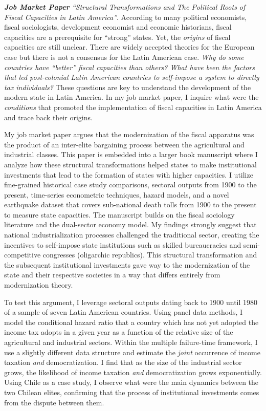\documentclass[11pt]{letter} %
\begin{document}
\begin{letter}{}
\emph{{\bf Job Market Paper} ``Structural Transformations and The Political Roots of Fiscal Capacities in Latin America''}. According  to many political economists, fiscal sociologists, development economist and economic historians, fiscal capacities are a prerequisite for ``strong'' states. Yet, the \emph{origins} of fiscal capacities are still unclear. There are widely accepted theories for the European case but there is not a consensus for the Latin American case. \emph{Why do some countries have ``better'' fiscal capacities than others? What have been the factors that led post-colonial Latin American countries to self-impose a system to directly tax individuals?} These questions are key to understand the development of the modern state in Latin America. In my job market paper, I inquire what were the \emph{conditions} that promoted the implementation of fiscal capacities in Latin America and trace back their origins.


My job market paper argues that the modernization of the fiscal apparatus was the product of an inter-elite bargaining process between the agricultural and industrial classes. This paper is embedded into a larger book manuscript where I analyze how these structural transformations helped states to make institutional investments that lead to the formation of states with higher capacities. I utilize fine-grained historical case study comparisons, sectoral outputs from 1900 to the present, time-series econometric techniques, hazard models, and a novel earthquake dataset that covers sub-national death tolls from 1900 to the present to measure state capacities. The manuscript builds on the fiscal sociology literature and the dual-sector economy model. My findings strongly suggest that national industrialization processes challenged the traditional sector, creating the incentives to self-impose state institutions such as skilled bureaucracies and semi-competitive congresses (oligarchic republics). This structural transformation and the subsequent institutional investments gave way to the modernization of the state and their respective societies in a way that differs entirely from modernization theory.


To test this argument, I leverage sectoral outputs dating back to 1900 until 1980 of a sample of seven Latin American countries. Using panel data methods, I model the conditional hazard ratio that a country which has not yet adopted the income tax adopts in a given year as a function of the relative size of the agricultural and industrial sectors. Within the multiple failure-time framework, I use a slightly different data structure and estimate the \emph{joint} occurrence of income taxation \emph{and} democratization. I find that as the size of the industrial sector grows, the likelihood of income taxation \emph{and} democratization grows exponentially. Using Chile as a case study, I observe what were the main dynamics between the two Chilean elites, confirming that the process of institutional investments comes from the dispute between them. 


\end{letter}
\end{document}
